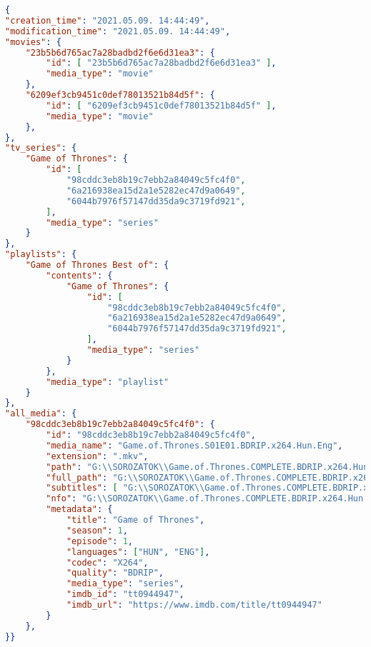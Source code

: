 \begin{lstlisting}[language={json}]
{
"creation_time": "2021.05.09. 14:44:49",
"modification_time": "2021.05.09. 14:44:49",
"movies": {
    "23b5b6d765ac7a28badbd2f6e6d31ea3": {
        "id": [ "23b5b6d765ac7a28badbd2f6e6d31ea3" ],
        "media_type": "movie"
    },
    "6209ef3cb9451c0def78013521b84d5f": {
        "id": [ "6209ef3cb9451c0def78013521b84d5f" ],
        "media_type": "movie"
    },
},
"tv_series": {
    "Game of Thrones": {
        "id": [
            "98cddc3eb8b19c7ebb2a84049c5fc4f0",
            "6a216938ea15d2a1e5282ec47d9a0649",
            "6044b7976f57147dd35da9c3719fd921",
        ],
        "media_type": "series"
    }
},
"playlists": {
    "Game of Thrones Best of": {
        "contents": {
            "Game of Thrones": {
                "id": [
                    "98cddc3eb8b19c7ebb2a84049c5fc4f0",
                    "6a216938ea15d2a1e5282ec47d9a0649",
                    "6044b7976f57147dd35da9c3719fd921",
                ],
                "media_type": "series"
            }
        },
        "media_type": "playlist"
    }
},
"all_media": {
    "98cddc3eb8b19c7ebb2a84049c5fc4f0": {
        "id": "98cddc3eb8b19c7ebb2a84049c5fc4f0",
        "media_name": "Game.of.Thrones.S01E01.BDRIP.x264.Hun.Eng",
        "extension": ".mkv",
        "path": "G:\\SOROZATOK\\Game.of.Thrones.COMPLETE.BDRIP.x264.Hun.Eng",
        "full_path": "G:\\SOROZATOK\\Game.of.Thrones.COMPLETE.BDRIP.x264.Hun.Eng\\Game.of.Thrones.S01E01.BDRIP.x264.Hun.Eng.mkv",
        "subtitles": [ "G:\\SOROZATOK\\Game.of.Thrones.COMPLETE.BDRIP.x264.Hun.Eng\\Game.of.Thrones.S01E01.BDRIP.x264.Hun.Eng.vtt" ],
        "nfo": "G:\\SOROZATOK\\Game.of.Thrones.COMPLETE.BDRIP.x264.Hun.Eng\\Game.of.Thrones.COMPLETE.BDRIP.x264.Hun.Eng.nfo",
        "metadata": {
            "title": "Game of Thrones",
            "season": 1,
            "episode": 1,
            "languages": ["HUN", "ENG"],
            "codec": "X264",
            "quality": "BDRIP",
            "media_type": "series",
            "imdb_id": "tt0944947",
            "imdb_url": "https://www.imdb.com/title/tt0944947"
        }
    },
}}
\end{lstlisting}


